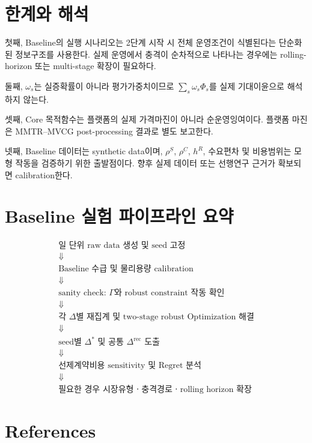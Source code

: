 \documentclass[11pt,a4paper]{article}
\begin{document}
\section{한계와 해석}

첫째, Baseline의 실행 시나리오는 2단계 시작 시 전체 운영조건이 식별된다는 단순화된 정보구조를 사용한다.
실제 운영에서 충격이 순차적으로 나타나는 경우에는 rolling-horizon 또는 multi-stage 확장이 필요하다.

둘째, $\omega_s$는 실증확률이 아니라 평가가중치이므로
$\sum_s\omega_s\Phi_s$를 실제 기대이윤으로 해석하지 않는다.

셋째, Core 목적함수는 플랫폼의 실제 가격마진이 아니라 순운영잉여이다.
플랫폼 마진은 MMTR--MVCG post-processing 결과로 별도 보고한다.

넷째, Baseline 데이터는 synthetic data이며,
$\rho^S$, $\rho^C$, $h^R$, 수요편차 및 비용범위는
모형 작동을 검증하기 위한 출발점이다.
향후 실제 데이터 또는 선행연구 근거가 확보되면 calibration한다.

\section{Baseline 실험 파이프라인 요약}

\[
\boxed{
\begin{array}{c}
\text{일 단위 raw data 생성 및 seed 고정}\\
\Downarrow\\
\text{Baseline 수급 및 물리용량 calibration}\\
\Downarrow\\
\text{sanity check: }\Gamma\text{와 robust constraint 작동 확인}\\
\Downarrow\\
\text{각 }\Delta\text{별 재집계 및 two-stage robust Optimization 해결}\\
\Downarrow\\
\text{seed별 }\Delta^*\text{ 및 공통 }\Delta^{\mathrm{rec}}\text{ 도출}\\
\Downarrow\\
\text{선제계약비용 sensitivity 및 Regret 분석}\\
\Downarrow\\
\text{필요한 경우 시장유형ㆍ충격경로ㆍrolling horizon 확장}
\end{array}
}
\]

\section{References}
\end{document}
